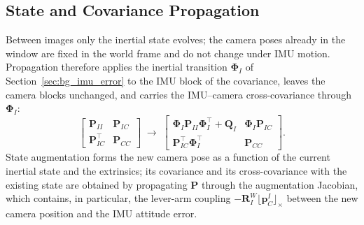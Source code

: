 \subsection{State and Covariance Propagation}
\label{sec:bg_propagation}
Between images only the inertial state evolves; the camera poses already in the window are fixed in the world frame and do not change under IMU motion. Propagation therefore applies the inertial transition $\boldsymbol{\Phi}_I$ of Section~\ref{sec:bg_imu_error} to the IMU block of the covariance, leaves the camera blocks unchanged, and carries the IMU--camera cross-covariance through $\boldsymbol{\Phi}_I$:
\begin{equation}
  \begin{bmatrix} \mathbf{P}_{II} & \mathbf{P}_{IC} \\ \mathbf{P}_{IC}^{\top} & \mathbf{P}_{CC} \end{bmatrix}
  \;\longrightarrow\;
  \begin{bmatrix} \boldsymbol{\Phi}_I \mathbf{P}_{II} \boldsymbol{\Phi}_I^{\top} + \mathbf{Q}_I & \boldsymbol{\Phi}_I \mathbf{P}_{IC} \\ \mathbf{P}_{IC}^{\top} \boldsymbol{\Phi}_I^{\top} & \mathbf{P}_{CC} \end{bmatrix}.
\end{equation}
State augmentation forms the new camera pose as a function of the current inertial state and the extrinsics; its covariance and its cross-covariance with the existing state are obtained by propagating $\mathbf{P}$ through the augmentation Jacobian, which contains, in particular, the lever-arm coupling $-\mathbf{R}_{I}^{W}\lfloor \mathbf{p}_{C}^{I} \rfloor_{\times}$ between the new camera position and the IMU attitude error.

